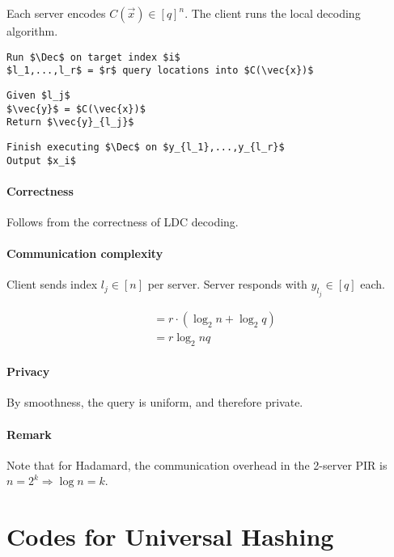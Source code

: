 \documentclass{idc_msc}
\DeclareMathOperator*{\Dec}{Dec}
\begin{document}
Each server encodes \(C(\vec{x}) \in [q]^n\).
The client runs the local decoding algorithm.

\begin{lstlisting}[frame=L,mathescape=true,title={Query}]
Run $\Dec$ on target index $i$
$l_1,...,l_r$ = $r$ query locations into $C(\vec{x})$
\end{lstlisting}

\begin{lstlisting}[frame=L,mathescape=true,title={Answer}]
Given $l_j$
$\vec{y}$ = $C(\vec{x})$
Return $\vec{y}_{l_j}$
\end{lstlisting}

\begin{lstlisting}[frame=L,mathescape=true,title={Reconstruct}]
Finish executing $\Dec$ on $y_{l_1},...,y_{l_r}$
Output $x_i$
\end{lstlisting}

\paragraph{Correctness}

Follows from the correctness of LDC decoding.

\paragraph{Communication complexity}

Client sends index \(l_j \in [n]\) per server.
Server responds with \(y_{l_j} \in [q]\) each.

\[
\begin{aligned}
&= r \cdot (\log_2 n + \log_2 q) \\
&= r \log_2 nq
\end{aligned}
\]

\paragraph{Privacy}

By smoothness, the query is uniform, and therefore private.

\paragraph{Remark}

Note that for Hadamard, the communication overhead in the 2-server PIR is \(n = 2^k \Rightarrow \log n = k\).


\clearpage
\section{Codes for Universal Hashing}
\end{document}
